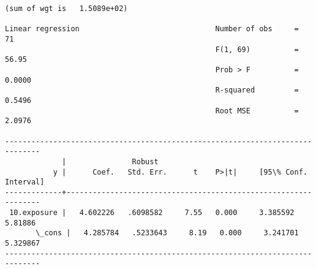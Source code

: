 \documentclass[11pt]{article}
\begin{document}
    \begin{Verbatim}[commandchars=\\\{\}]
(sum of wgt is   1.5089e+02)

Linear regression                               Number of obs     =         71
                                                F(1, 69)          =      56.95
                                                Prob > F          =     0.0000
                                                R-squared         =     0.5496
                                                Root MSE          =     2.0976

------------------------------------------------------------------------------
             |               Robust
           y |      Coef.   Std. Err.      t    P>|t|     [95\% Conf. Interval]
-------------+----------------------------------------------------------------
 10.exposure |   4.602226   .6098582     7.55   0.000     3.385592     5.81886
       \_cons |   4.285784   .5233643     8.19   0.000     3.241701    5.329867
------------------------------------------------------------------------------

    \end{Verbatim}


    
    
    
    
\end{document}

